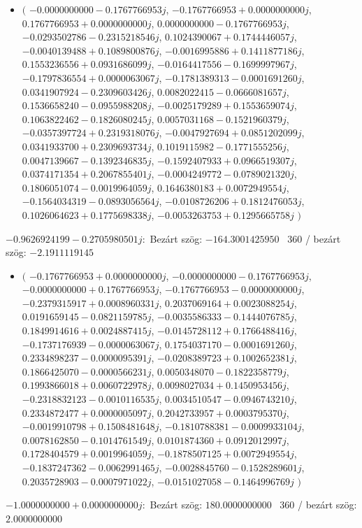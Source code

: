 \documentclass[14pt,a4paper]{article}
\begin{document}
\begin{itemize}
\item
$\big($
$-0.0000000000-0.1767766953j$, $-0.1767766953+0.0000000000j$, $0.1767766953+0.0000000000j$, $0.0000000000-0.1767766953j$, $-0.0293502786-0.2315218546j$, $0.1024390067+0.1744446057j$, $-0.0040139488+0.1089800876j$, $-0.0016995886+0.1411877186j$, $0.1553236556+0.0931686099j$, $-0.0164417556-0.1699997967j$, $-0.1797836554+0.0000063067j$, $-0.1781389313-0.0001691260j$, $0.0341907924-0.2309603426j$, $0.0082022415-0.0666081657j$, $0.1536658240-0.0955988208j$, $-0.0025179289+0.1553659074j$, $0.1063822462-0.1826080245j$, $0.0057031168-0.1521960379j$, $-0.0357397724+0.2319318076j$, $-0.0047927694+0.0851202099j$, $0.0341933700+0.2309693734j$, $0.1019115982-0.1771555256j$, $0.0047139667-0.1392346835j$, $-0.1592407933+0.0966519307j$, $0.0374171354+0.2067855401j$, $-0.0004249772-0.0789021320j$, $0.1806051074-0.0019964059j$, $0.1646380183+0.0072949554j$, $-0.1564034319-0.0893056564j$, $-0.0108726206+0.1812476053j$, $0.1026064623+0.1775698338j$, $-0.0053263753+0.1295665758j$
$\big)$
\end{itemize}
$-0.9626924199-0.2705980501j$:\
Bezárt szög: $-164.3001425950$ \
360 / bezárt szög: $-2.1911119145$\
\begin{itemize}
\item
$\big($
$-0.1767766953+0.0000000000j$, $-0.0000000000-0.1767766953j$, $-0.0000000000+0.1767766953j$, $-0.1767766953-0.0000000000j$, $-0.2379315917+0.0008960331j$, $0.2037069164+0.0023088254j$, $0.0191659145-0.0821159785j$, $-0.0035586333-0.1444076785j$, $0.1849914616+0.0024887415j$, $-0.0145728112+0.1766488416j$, $-0.1737176939-0.0000063067j$, $0.1754037170-0.0001691260j$, $0.2334898237-0.0000095391j$, $-0.0208389723+0.1002652381j$, $0.1866425070-0.0000566231j$, $0.0050348070-0.1822358779j$, $0.1993866018+0.0060722978j$, $0.0098027034+0.1450953456j$, $-0.2318832123-0.0010116535j$, $0.0034510547-0.0946743210j$, $0.2334872477+0.0000005097j$, $0.2042733957+0.0003795370j$, $-0.0019910798+0.1508481648j$, $-0.1810788381-0.0009933104j$, $0.0078162850-0.1014761549j$, $0.0101874360+0.0912012997j$, $0.1728404579+0.0019964059j$, $-0.1878507125+0.0072949554j$, $-0.1837247362-0.0062991465j$, $-0.0028845760-0.1528289601j$, $0.2035728903-0.0007971022j$, $-0.0151027058-0.1464996769j$
$\big)$
\end{itemize}
$-1.0000000000+0.0000000000j$:\
Bezárt szög: $180.0000000000$ \
360 / bezárt szög: $2.0000000000$\
\end{document}
